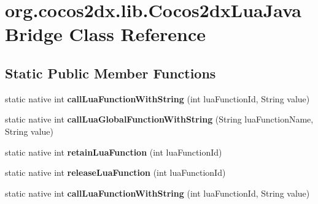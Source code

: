 \hypertarget{classorg_1_1cocos2dx_1_1lib_1_1Cocos2dxLuaJavaBridge}{}\section{org.\+cocos2dx.\+lib.\+Cocos2dx\+Lua\+Java\+Bridge Class Reference}
\label{classorg_1_1cocos2dx_1_1lib_1_1Cocos2dxLuaJavaBridge}
\subsection*{Static Public Member Functions}
\begin{DoxyCompactItemize}
\item 
\mbox{\label{classorg_1_1cocos2dx_1_1lib_1_1Cocos2dxLuaJavaBridge_aeb40271758c52735a50beaf45a047110}} 
static native int {\bfseries call\+Lua\+Function\+With\+String} (int lua\+Function\+Id, String value)
\item 
\mbox{\label{classorg_1_1cocos2dx_1_1lib_1_1Cocos2dxLuaJavaBridge_a407886edafc0dcfc5dd5a23392bf855b}} 
static native int {\bfseries call\+Lua\+Global\+Function\+With\+String} (String lua\+Function\+Name, String value)
\item 
\mbox{\label{classorg_1_1cocos2dx_1_1lib_1_1Cocos2dxLuaJavaBridge_aeaa9fb66524416cd7b7697705c1bcb0a}} 
static native int {\bfseries retain\+Lua\+Function} (int lua\+Function\+Id)
\item 
\mbox{\label{classorg_1_1cocos2dx_1_1lib_1_1Cocos2dxLuaJavaBridge_a392a35daa8a6cbf4d334fabe968a6603}} 
static native int {\bfseries release\+Lua\+Function} (int lua\+Function\+Id)
\item 
\mbox{\label{classorg_1_1cocos2dx_1_1lib_1_1Cocos2dxLuaJavaBridge_aeb40271758c52735a50beaf45a047110}} 
static native int {\bfseries call\+Lua\+Function\+With\+String} (int lua\+Function\+Id, String value)
\item 
\mbox{\label{classorg_1_1cocos2dx_1_1lib_1_1Cocos2dxLuaJavaBridge_a407886edafc0dcfc5dd5a23392bf855b}} 

\end{DoxyCompactItemize}
